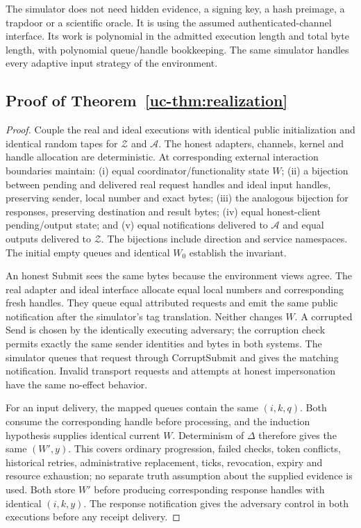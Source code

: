 The simulator does not need hidden evidence, a signing key, a hash
preimage, a trapdoor or a scientific oracle. It is using the assumed
authenticated-channel interface. Its work is polynomial in the admitted
execution length and total byte length, with polynomial queue/handle
bookkeeping. The same simulator handles every adaptive input strategy
of the environment.

\subsection{Proof of Theorem~\ref{uc-thm:realization}}
\begin{proof}
Couple the real and ideal executions with identical public initialization
and identical random tapes for $\mathcal Z$ and $\mathcal A$. The honest
adapters, channels, kernel and handle allocation are deterministic.
At corresponding external interaction boundaries maintain:
(i) equal coordinator/functionality state $W$;
(ii) a bijection between pending and delivered real request handles and
ideal input handles, preserving sender, local number and exact bytes;
(iii) the analogous bijection for responses, preserving destination and
result bytes; (iv) equal honest-client pending/output state; and
(v) equal notifications delivered to $\mathcal A$ and equal outputs
delivered to $\mathcal Z$. The bijections include direction and service
namespaces. The initial empty queues and identical $W_0$ establish the
invariant.

An honest Submit sees the same bytes because the environment views agree.
The real adapter and ideal interface allocate equal local numbers and
corresponding fresh handles. They queue equal attributed requests and
emit the same public notification after the simulator's tag translation.
Neither changes $W$. A corrupted Send is chosen by the identically
executing adversary; the corruption check permits exactly the same
sender identities and bytes in both systems. The simulator queues that
request through CorruptSubmit and gives the matching notification.
Invalid transport requests and attempts at honest impersonation have
the same no-effect behavior.

For an input delivery, the mapped queues contain the same $(i,k,q)$.
Both consume the corresponding handle before processing, and the
induction hypothesis supplies identical current $W$. Determinism of
$\Delta$ therefore gives the same $(W',y)$. This covers ordinary
progression, failed checks, token conflicts, historical retries,
administrative replacement, ticks, revocation, expiry and resource
exhaustion; no separate truth assumption about the supplied evidence
is used. Both store $W'$ before producing corresponding response handles
with identical $(i,k,y)$. The response notification gives the adversary
control in both executions before any receipt delivery.


\end{proof}
